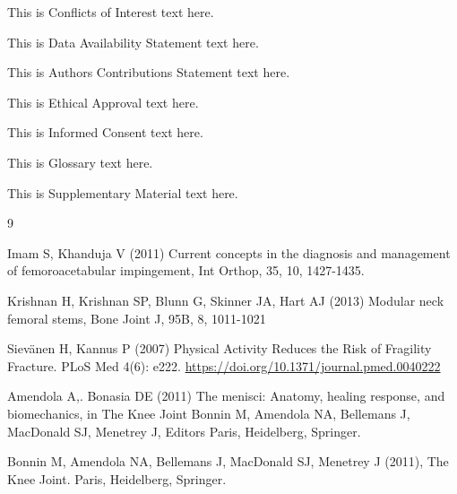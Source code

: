 \documentclass[a4paper,10pt]{edpsci} %
\begin{document}
\conflict

This is Conflicts of Interest text here.

\dataavailability

This is Data Availability Statement text here.

\authorcontrib

This is Authors Contributions Statement text here.

\ethics

This is Ethical Approval text here.

\informedconsent

This is Informed Consent text here.

\glossary

This is Glossary text here.

\supplementary

This is Supplementary Material text here.


\begin{thebibliography}{9}

 Imam S, Khanduja V (2011) Current concepts in the diagnosis and management of femoroacetabular impingement, Int Orthop, 35, 10, 1427-1435.

 Krishnan H, Krishnan SP, Blunn G, Skinner JA, Hart AJ (2013) Modular neck femoral stems, Bone Joint J, 95B, 8, 1011-1021

 Siev\"{a}nen H, Kannus P (2007) Physical Activity Reduces the Risk of Fragility Fracture. PLoS Med 4(6): e222. \url{https://doi.org/10.1371/journal.pmed.0040222}

 Amendola A,. Bonasia DE (2011) The menisci: Anatomy, healing response, and biomechanics, in The Knee Joint Bonnin M, Amendola NA, Bellemans J, MacDonald SJ, Menetrey J, Editors Paris, Heidelberg, Springer.

 Bonnin M, Amendola NA, Bellemans J, MacDonald SJ, Menetrey J (2011), The Knee Joint. Paris, Heidelberg, Springer.

\end{thebibliography}



\end{document}
